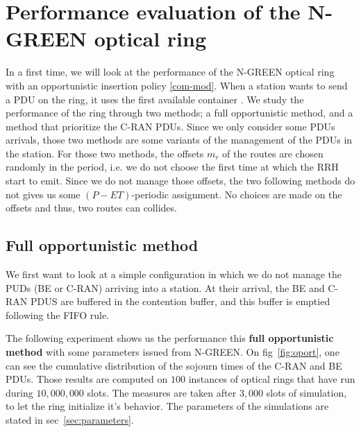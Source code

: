 \documentclass[]{algotel}
\begin{document}
   \section{Performance evaluation of the N-GREEN optical ring}
   \label{sec:oportmethods}
   In a first time, we will look at the performance of the N-GREEN optical ring with an opportunistic insertion policy \ref{com-mod}. When a station wants to send a PDU on the ring, it uses the first available container .
    We study the performance of the ring through two methods; a full opportunistic method, and a method that prioritize the C-RAN PDUs. Since we only consider some PDUs arrivals, those two methods are some variants of the management of the PDUs in the station.
   For those two methods, the offsets $m_r$ of the routes are chosen randomly in the period, i.e. we do not choose the first time at which the RRH start to emit.
   Since we do not manage those offsets, the two following methods do not gives us some $(P-ET)$-periodic assignment. No choices are made on the offsets and thus, two routes can collides. 

    
    \subsection{Full opportunistic method}
    \label{sec:fullopport}
    We first want to look at a simple configuration in which we do not manage the PUDs (BE or C-RAN) arriving into a station. At their arrival, the BE and C-RAN PDUS are buffered in the contention buffer, and this buffer is emptied following the FIFO rule.

The following experiment shows us the performance this {\bf full opportunistic method} with some parameters issued from N-GREEN. 
On fig~\ref{fig:oport}, one can see the cumulative distribution of the sojourn times of the C-RAN and BE PDUs. Those results are computed on $100$ instances of optical rings that have run during $10,000,000$ slots. The measures are taken after $3,000$ slots of simulation, to let the ring initialize it's behavior. The parameters of the simulations are stated in sec~\ref{sec:parameters}.
\end{document}
